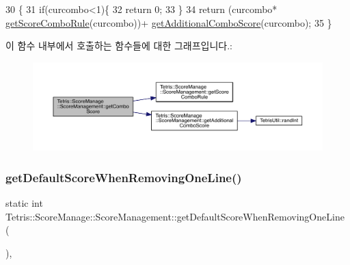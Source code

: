 \begin{DoxyCode}
30                                                           \{
31                     \textcolor{keywordflow}{if}(curcombo<1)\{
32                         \textcolor{keywordflow}{return} 0;
33                     \}
34                     \textcolor{keywordflow}{return} (curcombo* \hyperlink{class_tetris_1_1_score_manage_1_1_score_management_a41c245dcf773c6c677c2e31f6ac17944}{getScoreComboRule}(curcombo))+ 
      \hyperlink{class_tetris_1_1_score_manage_1_1_score_management_a66b6a1d3fdc8fb9f91f1d7bfc7854579}{getAdditionalComboScore}(curcombo);
35                 \}
\end{DoxyCode}
이 함수 내부에서 호출하는 함수들에 대한 그래프입니다.\+:
\nopagebreak
\begin{figure}[H]
\begin{center}
\leavevmode
\includegraphics[width=350pt]{d9/d94/class_tetris_1_1_score_manage_1_1_score_management_a89203c0689645e7e4ad75d8fd634aa11_cgraph}
\end{center}
\end{figure}
\mbox{\label{class_tetris_1_1_score_manage_1_1_score_management_a1bedf7a989466ad1b6b8b2259eb2eff7}} 
\subsubsection{\texorpdfstring{get\+Default\+Score\+When\+Removing\+One\+Line()}{getDefaultScoreWhenRemovingOneLine()}}
{\footnotesize\ttfamily static int Tetris\+::\+Score\+Manage\+::\+Score\+Management\+::get\+Default\+Score\+When\+Removing\+One\+Line (\begin{DoxyParamCaption}{ }\end{DoxyParamCaption})\hspace{0.3cm}{\ttfamily [inline]}, {\ttfamily [static]}}



